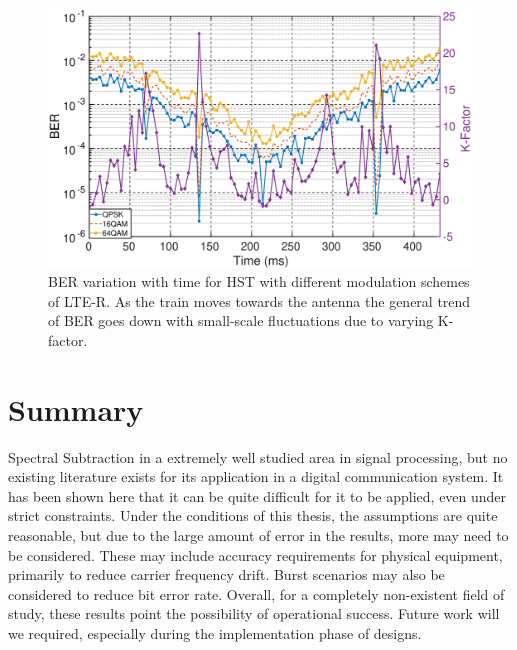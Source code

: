 \begin{figure}[!ht]
\label{kfactorber}
\centering
\includegraphics[width=\linewidth,keepaspectratio]{images/Gill/lte_figs/kfactorcontinuous.eps} 
\caption{BER variation with time for HST with different modulation schemes of LTE-R. As the train moves towards
the antenna the general trend of BER goes down with small-scale fluctuations due to varying K-factor.}
\end{figure}




\section{Summary}

Spectral Subtraction in a extremely well studied area in signal processing, but no existing literature exists for its application in a digital communication system.  It has been shown here that it can be quite difficult for it to be applied, even under strict constraints.  Under the conditions of this thesis, the assumptions are quite reasonable, but due to the large amount of error in the results, more may need to be considered.  These may include accuracy requirements for physical equipment, primarily to reduce carrier frequency drift.  Burst scenarios may also be considered to reduce bit error rate.  Overall, for a completely non-existent field of study, these results point the possibility of operational success.  Future work will we required, especially during the implementation phase of designs.\\



